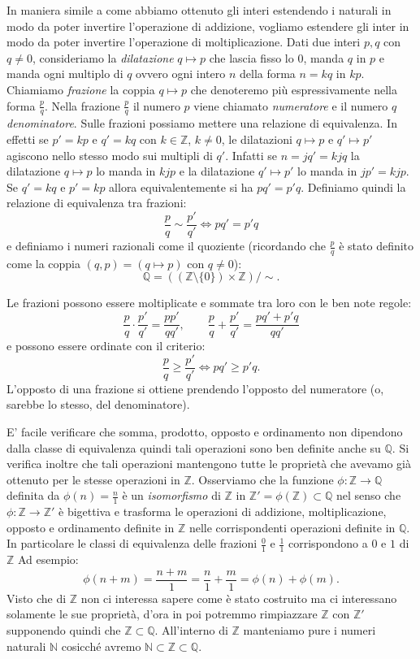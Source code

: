 \documentclass[italian,a4paper,hidelinks,headinclude]{scrartcl}
\newcommand{\NN}{{\mathbb N}}
\newcommand{\ZZ}{{\mathbb Z}}
\newcommand{\QQ}{{\mathbb Q}}
\newcommand{\myemph}[1]{\emph{#1}\marginpar{#1}}
\begin{document}
In maniera simile a come abbiamo ottenuto gli interi estendendo i naturali in
modo da poter invertire l'operazione di addizione, vogliamo estendere gli
inter in modo da poter invertire l'operazione di moltiplicazione.
Dati due interi $p,q$ con $q\neq 0$,
consideriamo la \emph{dilatazione} $q\mapsto p$ che
lascia fisso lo $0$, manda $q$ in $p$ e manda ogni multiplo di $q$ ovvero
ogni intero $n$ della forma $n=kq$ in $kp$.
Chiamiamo \myemph{frazione} la coppia $q\mapsto p$ che denoteremo più espressivamente
nella forma $\frac{p}{q}$.
Nella frazione $\frac{p}{q}$ il numero $p$ viene chiamato \myemph{numeratore}
e il numero $q$ \myemph{denominatore}.
Sulle frazioni possiamo mettere una relazione di equivalenza.
In effetti se $p'=kp$ e $q'=kq$ con $k\in \ZZ$, $k\neq 0$,
le dilatazioni $q\mapsto p$ e $q'\mapsto p'$
agiscono nello stesso modo sui multipli di $q'$.
Infatti se $n=jq'=kjq$ la dilatazione $q\mapsto p$ lo manda in $kjp$ e
la dilatazione $q'\mapsto p'$ lo manda in $jp'=kjp$.
Se $q'=kq$ e $p'=kp$ allora equivalentemente si ha $pq'=p'q$.
Definiamo quindi la relazione di equivalenza tra frazioni:
\[
  \frac{p}{q} \sim \frac{p'}{q'} \iff pq' = p'q
\]
e definiamo
i numeri razionali come il quoziente
(ricordando che $\frac p q$ è stato definito come la coppia
$(q,p)=(q\mapsto p)$ con $q\neq 0$):
\[
  \QQ = ((\ZZ\setminus\{0\})\times\ZZ)/{\sim}.
\]

Le frazioni possono essere moltiplicate e sommate tra loro con le ben note
regole:
\[
  \frac{p}{q}\cdot \frac{p'}{q'} = \frac{pp'}{qq'},\qquad
  \frac{p}{q} + \frac{p'}{q'} = \frac{pq' + p'q}{qq'}
\]
e possono essere ordinate con il criterio:
\[
 \frac{p}{q} \ge \frac{p'}{q'} \iff pq' \ge p'q.
\]
L'opposto di una frazione si ottiene prendendo l'opposto del numeratore
(o, sarebbe lo stesso, del denominatore).

E' facile verificare che somma, prodotto, opposto  e ordinamento non dipendono
dalla classe di equivalenza quindi tali operazioni sono ben definite
anche su $\QQ$. Si verifica inoltre che tali operazioni mantengono tutte le
proprietà che avevamo già ottenuto per le stesse operazioni in $\ZZ$.
Osserviamo che la funzione $\phi\colon \ZZ \to \QQ$ definita da
$\phi(n) = \frac{n}{1}$ è un \emph{isomorfismo} di $\ZZ$ in
$\ZZ' = \phi(\ZZ)\subset \QQ$ nel senso che $\phi\colon \ZZ \to \ZZ'$ è bigettiva
e trasforma le operazioni di addizione, moltiplicazione, opposto e ordinamento
definite in $\ZZ$ nelle corrispondenti operazioni definite in $\QQ$.
In particolare le classi di equivalenza delle frazioni $\frac{0}{1}$
e $\frac{1}{1}$ corrispondono
a $0$ e $1$ di $\ZZ$
Ad esempio:
\[
  \phi(n+m) = \frac{n+m}{1} = \frac{n}{1} + \frac{m}{1} = \phi(n) + \phi(m).
\]
Visto che di $\ZZ$ non ci interessa sapere come è stato costruito ma ci
interessano solamente le sue proprietà, d'ora in poi potremmo rimpiazzare
$\ZZ$ con $\ZZ'$ supponendo quindi che $\ZZ \subset \QQ$.
All'interno di $\ZZ$
manteniamo pure i numeri naturali $\NN$ cosicché avremo $\NN \subset \ZZ \subset \QQ$.
\end{document}
